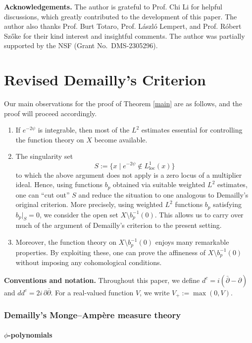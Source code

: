 \documentclass[a4paper, 12pt]{article}
\newcommand{\loc}{\mathrm{loc}}
\begin{document}
\noindent\textbf{Acknowledgements.}
The author is grateful to Prof. Chi Li for helpful discussions, which greatly contributed to the development of this paper. The author also thanks Prof. Burt Totaro, Prof. L\'aszl\'o Lempert, and Prof. R\'obert Sz\H oke for their kind interest and insightful comments. The author was partially supported by the NSF (Grant No.~DMS-2305296).

\part{Revised Demailly's Criterion}
Our main observations for the proof of Theorem \ref{main} are as follows, and the proof will proceed accordingly.

\begin{enumerate}
\item If $e^{-2\psi}$ is integrable, then most of the $L^2$ estimates essential for controlling the function theory on $X$ become available.

\item The singularity set
\[
S := \{ x \mid e^{-2\psi} \notin L^1_\loc(x) \}
\]
to which the above argument does not apply is a zero locus of a multiplier ideal. Hence, using functions $b_p$ obtained via suitable weighted $L^2$ estimates, one can ``cut out'' $S$ and reduce the situation to one analogous to Demailly's original criterion. More precisely, using weighted $L^2$ functions $b_p$ satisfying $b_p|_S = 0$, we consider the open set $X \setminus b_p^{-1}(0)$. This allows us to carry over much of the argument of Demailly's criterion to the present setting.

\item Moreover, the function theory on $X \setminus b_p^{-1}(0)$ enjoys many remarkable properties. By exploiting these, one can prove the affineness of $X \setminus b_p^{-1}(0)$ without imposing any cohomological conditions.
\end{enumerate}

\noindent\textbf{Conventions and notation.}
Throughout this paper, we define $d^c = i(\bar{\partial} - \partial)$ and $dd^c = 2i\,\partial\bar{\partial}$. For a real-valued function $V$, we write $V_+ := \max(0,V)$.
\section{Demailly's Monge--Amp\`ere measure theory}
\subsection{$\phi$-polynomials}
\end{document}
